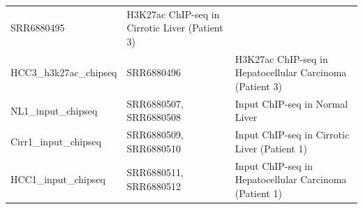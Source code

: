 \documentclass[]{article}
\begin{document}
\begin{longtable}[]{@{}lll@{}}
\begin{minipage}[t]{0.27\columnwidth}
SRR6880495\strut
\end{minipage} & \begin{minipage}[t]{0.32\columnwidth}\raggedright\strut
H3K27ac ChIP-seq in Cirrotic Liver (Patient 3)\strut
\end{minipage}\tabularnewline
\begin{minipage}[t]{0.32\columnwidth}\raggedright\strut
HCC3\_h3k27ac\_chipseq\strut
\end{minipage} & \begin{minipage}[t]{0.27\columnwidth}\raggedright\strut
SRR6880496\strut
\end{minipage} & \begin{minipage}[t]{0.32\columnwidth}\raggedright\strut
H3K27ac ChIP-seq in Hepatocellular Carcinoma (Patient 3)\strut
\end{minipage}\tabularnewline
\begin{minipage}[t]{0.32\columnwidth}\raggedright\strut
NL1\_input\_chipseq\strut
\end{minipage} & \begin{minipage}[t]{0.27\columnwidth}\raggedright\strut
SRR6880507, SRR6880508\strut
\end{minipage} & \begin{minipage}[t]{0.32\columnwidth}\raggedright\strut
Input ChIP-seq in Normal Liver\strut
\end{minipage}\tabularnewline
\begin{minipage}[t]{0.32\columnwidth}\raggedright\strut
Cirr1\_input\_chipseq\strut
\end{minipage} & \begin{minipage}[t]{0.27\columnwidth}\raggedright\strut
SRR6880509, SRR6880510\strut
\end{minipage} & \begin{minipage}[t]{0.32\columnwidth}\raggedright\strut
Input ChIP-seq in Cirrotic Liver (Patient 1)\strut
\end{minipage}\tabularnewline
\begin{minipage}[t]{0.32\columnwidth}\raggedright\strut
HCC1\_input\_chipseq\strut
\end{minipage} & \begin{minipage}[t]{0.27\columnwidth}\raggedright\strut
SRR6880511, SRR6880512\strut
\end{minipage} & \begin{minipage}[t]{0.32\columnwidth}\raggedright\strut
Input ChIP-seq in Hepatocellular Carcinoma (Patient 1)\strut
\end{minipage}\tabularnewline

\end{longtable}
\end{document}
